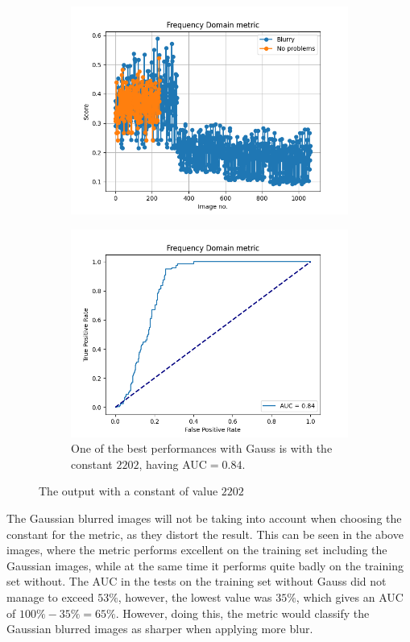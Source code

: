 \begin{figure}[H]
    \begin{subfigure}[t]{0.48\textwidth}
        \includegraphics[width=\textwidth]{Figures/tweakFM/2202_output_basic_gauss.png}
        \caption{}
        \label{fig:FM_basic_gauss_2202}
    \end{subfigure}\hspace{1em}
    \begin{subfigure}[t]{0.48\textwidth}
        \includegraphics[width=\textwidth]{Figures/tweakFM/2202_output_roc_gauss.png}
        \caption{One of the best performances with Gauss is with the constant $2202$, having AUC$=0.84$.}
        \label{fig:FM_roc_gauss_2202}
    \end{subfigure}
    \caption{The output with a constant of value $2202$}
\end{figure}
The Gaussian blurred images will not be taking into account when choosing the constant for the metric, as they distort the result. This can be seen in the above images, where the metric performs excellent on the training set including the Gaussian images, while at the same time it performs quite badly on the training set without. The AUC in the tests on the training set without Gauss did not manage to exceed $53\%$, however, the lowest value was $35\%$, which gives an AUC of $100\%-35\%=65\%$. However, doing this, the metric would classify the Gaussian blurred images as sharper when applying more blur.

